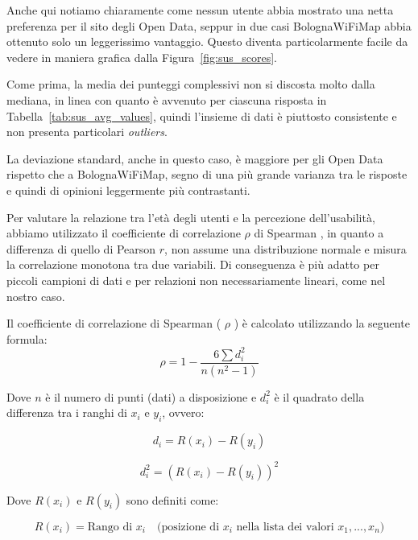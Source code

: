 Anche qui notiamo chiaramente come nessun utente abbia mostrato una netta preferenza per il sito degli Open Data, seppur in due casi BolognaWiFiMap abbia ottenuto solo un leggerissimo vantaggio. Questo diventa particolarmente facile da vedere in maniera grafica dalla Figura~\ref{fig:sus_scores}.

Come prima, la media dei punteggi complessivi non si discosta molto dalla mediana, in linea con quanto è avvenuto per ciascuna risposta in Tabella~\ref{tab:sus_avg_values}, quindi l'insieme di dati è piuttosto consistente e non presenta particolari \textit{outliers}.

La deviazione standard, anche in questo caso, è maggiore per gli Open Data rispetto che a BolognaWiFiMap, segno di una più grande varianza tra le risposte e quindi di opinioni leggermente più contrastanti.

Per valutare la relazione tra l'età degli utenti e la percezione dell'usabilità, abbiamo utilizzato il coefficiente di correlazione \( \rho \) di Spearman , in quanto a differenza di quello di Pearson \( r \), non assume una distribuzione normale e misura la correlazione monotona tra due variabili. Di conseguenza è più adatto per piccoli campioni di dati e per relazioni non necessariamente lineari, come nel nostro caso.

Il coefficiente di correlazione di Spearman ( \( \rho \) ) è calcolato utilizzando la seguente formula:
\begin{equation}
    \rho = 1 - \frac{6 \sum d_i^2}{n(n^2 - 1)}
    \label{eq:spearman_correlation_coefficient}
\end{equation}

Dove \( n \) è il numero di punti (dati) a disposizione e \( d_i^2 \) è il quadrato della differenza tra i ranghi di \( x_i \) e \( y_i \), ovvero:

\begin{equation}
    d_i = R(x_i) - R(y_i)
    \label{eq:rank_difference}
\end{equation}

\begin{equation}
    d_i^2 = (R(x_i) - R(y_i))^2
    \label{eq:squared_rank_difference}
\end{equation}

Dove \( R(x_i) \) e \( R(y_i) \) sono definiti come:

\begin{equation}
    R(x_i) = \text{Rango di } x_i \quad \text{(posizione di } x_i \text{ nella lista dei valori } x_1, ..., x_n \text{)}
    \label{eq:rank_x}
\end{equation}

